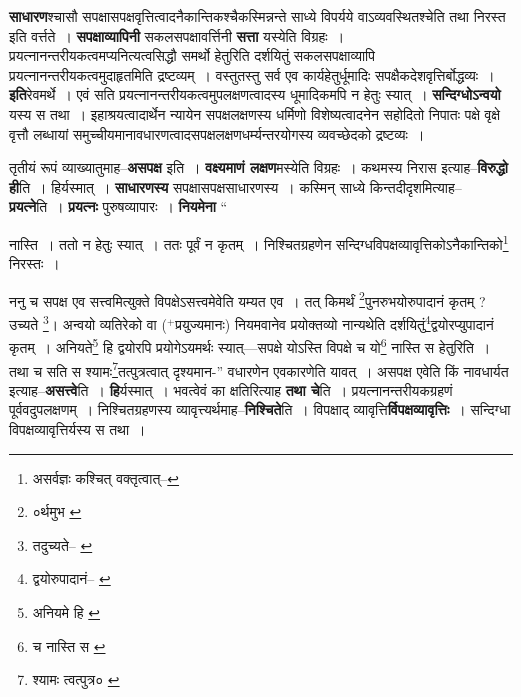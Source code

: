 \documentclass[article,12pt,a4paper]{memoir}
\newcommand{\add}[1]{($^{+}$#1)}
\begin{document}
	  \endgroup
	

	  \pstart \textbf{साधारण}श्चासौ सपक्षासपक्षवृत्तित्वादनैकान्तिकश्चैकस्मिन्नन्ते साध्ये विपर्यये वाऽव्यवस्थितश्चेति तथा निरस्त इति वर्त्तते । \textbf{सपक्षाव्यापिनी} सकलसपक्षावर्त्तिनी \textbf{सत्ता} यस्येति विग्रहः । प्रयत्नानन्तरीयकत्वमप्यनित्यत्वसिद्धौ समर्थो हेतुरिति दर्शयितुं सकलसपक्षाव्यापि प्रयत्नानन्तरीयकत्वमुदाहृतमिति द्रष्टव्यम् । वस्तुतस्तु सर्व एव कार्यहेतुर्धूमादिः सपक्षैकदेशवृत्तिर्बोद्धव्यः । \textbf{इति}रेवमर्थे । एवं सति प्रयत्नानन्तरीयकत्वमुपलक्षणत्वादस्य धूमादिकमपि न हेतुः स्यात् । \textbf{सन्दिग्धोऽन्वयो} यस्य स तथा । इहाश्रयत्वादार्थेन न्यायेन सपक्षलक्षणस्य धर्मिणो विशेष्यत्वादनेन सहोदितो निपातः पक्षे वृक्षे वृत्तौ लब्धायां समुच्चीयमानावधारणत्वादसपक्षलक्षणधर्म्यन्तरयोगस्य व्यवच्छेदको द्रष्टव्यः ।
	\pend
      

	  \pstart तृतीयं रूपं व्याख्यातुमाह--\textbf{असपक्ष} इति । \textbf{वक्ष्यमाणं लक्षण}मस्येति विग्रहः । कथमस्य निरास इत्याह--\textbf{विरुद्धो ही}ति । हिर्यस्मात् । \textbf{साधारणस्य} सपक्षासपक्षसाधारणस्य । कस्मिन् साध्ये किन्तदीदृशमित्याह--\textbf{प्रयत्ने}ति । \textbf{प्रयत्नः} पुरुषव्यापारः । \textbf{नियमेना}  \leavevmode{} “
	  
	नास्ति । ततो न हेतुः स्यात् । ततः पूर्वं न कृतम् । निश्चितग्रहणेन सन्दिग्धविपक्षव्यावृत्तिकोऽनैकान्तिको\footnote{असर्वज्ञः कश्चित् वक्तृत्वात्--\cite{dp-msD-n}} निरस्तः । 
	  
	ननु च सपक्ष एव सत्त्वमित्युक्ते विपक्षेऽसत्त्वमेवेति यम्यत एव । तत् किमर्थं \footnote{०र्थमुभ \cite{dp-msC} \cite{dp-msD}}पुनरुभयोरुपादानं कृतम् ? उच्यते \footnote{तदुच्यते--\cite{dp-msA} \cite{dp-edP} \cite{dp-edH} \cite{dp-edE}}। अन्वयो व्यतिरेको वा \add{प्रयुज्यमानः} नियमवानेव प्रयोक्तव्यो नान्यथेति दर्शयितुं\footnote{द्वयोरुपादानं--\cite{dp-msB} \cite{dp-msC} \cite{dp-msD}}द्वयोरप्युपादानं कृतम् । अनियते\footnote{अनियमे हि \cite{dp-msA} \cite{dp-edP} \cite{dp-edH} \cite{dp-edE} \cite{dp-edN}} हि द्वयोरपि प्रयोगेऽयमर्थः स्यात्—सपक्षे योऽस्ति विपक्षे च यो\footnote{च नास्ति स \cite{dp-msA} \cite{dp-msB} \cite{dp-msD} \cite{dp-edP} \cite{dp-edH} \cite{dp-edE} \cite{dp-edN}} नास्ति स हेतुरिति । तथा च सति स श्यामः\footnote{श्यामः त्वत्पुत्र० \cite{dp-msC}}तत्पुत्रत्वात् दृश्यमान-” वधारणेन एवकारणेति यावत् । असपक्ष एवेति किं नावधार्यत इत्याह--\textbf{असत्त्वे}ति । \textbf{हि}र्यस्मात् । भवत्वेवं का क्षतिरित्याह \textbf{तथा चे}ति । प्रयत्नानन्तरीयकग्रहणं पूर्ववदुपलक्षणम् । निश्चितग्रहणस्य व्यावृत्त्यर्थमाह--\textbf{निश्चिते}ति । विपक्षाद् व्यावृत्ति\textbf{र्विपक्षव्यावृत्तिः} । सन्दिग्धा विपक्षव्यावृत्तिर्यस्य स तथा ।
	\pend
      
\end{document}

